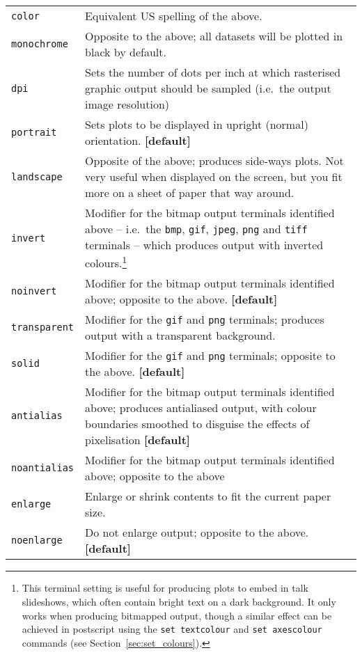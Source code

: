 \begin{longtable}{p{3cm}p{9cm}}
{\tt color} & Equivalent US spelling of the above. \\
{\tt monochrome} & Opposite to the above; all datasets will be plotted in black by default.\index{monochrome output}\\
{\tt dpi} & Sets the number of dots per inch at which rasterised graphic output should be sampled (i.e.\ the output image resolution)\\
{\tt portrait} & Sets plots to be displayed in upright (normal) orientation. {\bf [default]}\index{portrait orientation}\\
{\tt landscape} & Opposite of the above; produces side-ways plots. Not very useful when displayed on the screen, but you fit more on a sheet of paper that way around.\index{landscape orientation}\\
{\tt invert} & Modifier for the bitmap output terminals identified above -- i.e.\ the {\tt bmp}, {\tt gif}, {\tt jpeg}, {\tt png} and {\tt tiff} terminals -- which produces output with inverted colours.\footnote{This terminal setting is useful for producing plots to embed in talk slideshows, which often contain bright text on a dark background. It only works when producing bitmapped output, though a similar effect can be achieved in postscript using the {\tt set textcolour} and {\tt set axescolour} commands (see Section~\ref{sec:set_colours}).}\index{colours!inverting}\\
{\tt noinvert} & Modifier for the bitmap output terminals identified above; opposite to the above. {\bf [default]}\\
{\tt transparent} & Modifier for the {\tt gif} and {\tt png} terminals; produces output with a transparent background.\index{transparent terminal}\index{gif output!transparency}\index{png output!transparency}\\
{\tt solid} & Modifier for the {\tt gif} and {\tt png} terminals; opposite to the above. {\bf [default]}\\
{\tt antialias} & Modifier for the bitmap output terminals identified above; produces antialiased output, with colour boundaries smoothed to disguise the effects of pixelisation {\bf [default]}\\
{\tt noantialias} & Modifier for the bitmap output terminals identified above; opposite to the above\\
{\tt enlarge} & Enlarge or shrink contents to fit the current paper size.\index{enlarging output}\\
{\tt noenlarge} & Do not enlarge output; opposite to the above. {\bf [default]}\\
\end{longtable}

